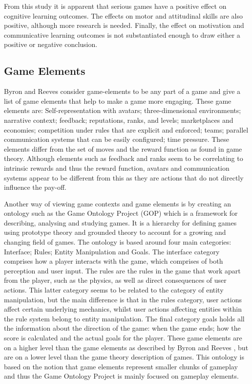 \documentclass[11pt]{article}
\begin{document}
From this study it is apparent that serious games have a positive effect on cognitive learning outcomes. The effects on motor and attitudinal skills are also positive, although more research is needed. Finally, the effect on motivation and communicative learning outcomes is not substantiated enough to draw either a positive or negative conclusion.


\cite{Kelle2011}\cite{Amory2006}\cite{Wouters2011}\cite{Kafai2006}\cite{Gros2007}\cite{Staalduinen2011}\cite{Becker2007}


\subsection{Game Elements}
Byron and Reeves \cite{Byron2009} consider game-elements to be any part of a game and give a list of game elements that help to make a game more engaging. These game elements are: Self-representation with avatars; three-dimensional environments; narrative context; feedback; reputations, ranks, and levels; marketplaces and economies; competition under rules that are explicit and enforced; teams; parallel communication systems that can be easily configured; time pressure. These elements differ from the set of moves and the reward function as found in game theory. Although elements such as feedback and ranks seem to be correlating to intrinsic rewards and thus the reward function, avatars and communication systems appear to be different from this as they are actions that do not directly influence the pay-off.

Another way of viewing game contexts and game elements is by creating an ontology such as the Game Ontology Project (GOP) \cite{Zagal2008} which is a framework for describing, analysing and studying games. It is a hierarchy for defining games using prototype theory and grounded theory to account for a growing and changing field of games. The ontology is based around four main categories: Interface; Rules; Entity Manipulation and Goals. The interface category comprises how a player interacts with the game, which comprises of both perception and user input. The rules are the rules in the game that work apart from the player, such as the physics, as well as direct consequences of user actions. This latter category seems to be related to the category of entity manipulation, but the main difference is that in the rules category, user actions affect certain underlying mechanics, whilst user actions affecting entities within the rule system belong to entity manipulation. The final category goals holds all the 
information about the direction of the game: when the game ends; how the score is calculated and the actual goals for the player.
These game elements are on a higher level than the game elements as described by Byron and Reeves \cite{Byron2009}, but are on a lower level than the game theory description of games. This ontology is based on the notion that game elements represent smaller chunks of gameplay \cite{Zagal2009} and thus the Game Ontology Project is mainly focused on gameplay elements.
\end{document}
